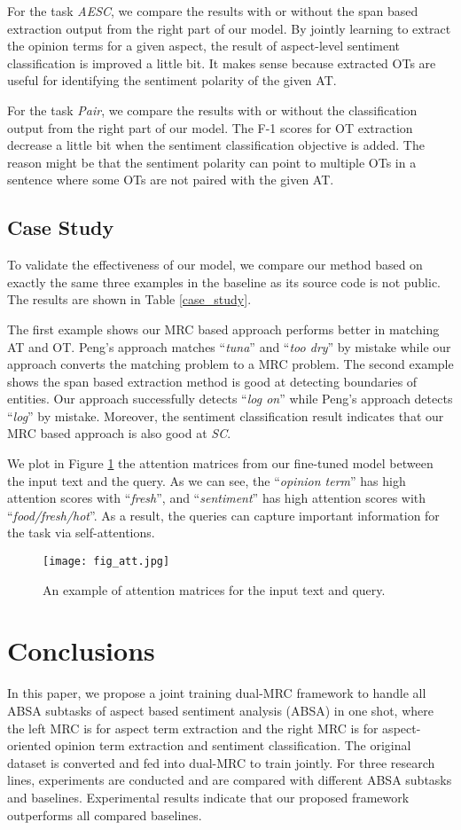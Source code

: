 \documentclass[letterpaper]{article} \usepackage{aaai21}  \usepackage{times}  \usepackage{helvet} \usepackage{courier}  \usepackage[hyphens]{url}  \usepackage{graphicx} \urlstyle{rm} \def\UrlFont{\rm}  \usepackage{natbib}  \usepackage{caption}
\begin{document}
For the task \emph{AESC}, we compare the results with or without the span based extraction output from the right part of our model.
By jointly learning to extract the opinion terms for a given aspect, the result of aspect-level sentiment classification is improved a little bit.  
It makes sense because extracted OTs are useful for identifying the sentiment polarity of the given AT. 

For the task \emph{Pair}, we compare the results with or without the classification output from the right part of our model. 
The F-1 scores for OT extraction decrease a little bit when the sentiment classification objective is added. 
The reason might be that the sentiment polarity can point to multiple OTs in a sentence where some OTs are not paired with the given AT.
 

\subsection{Case Study}
To validate the effectiveness of our model, we compare our method based on exactly the same three examples in the baseline \cite{peng2020knowing} as its source code is not public. 
The results are shown in Table \ref{case_study}.

The first example shows our MRC based approach performs better in matching AT and OT. 
Peng's approach matches ``\emph{tuna}'' and ``\emph{too dry}'' by mistake while our approach converts the matching problem to a MRC problem. 
The second example shows the span based extraction method is good at detecting boundaries of entities. 
Our approach successfully detects ``\emph{log on}'' while Peng's approach detects ``\emph{log}'' by mistake.
Moreover, the sentiment classification result indicates that our MRC based approach is also good at \emph{SC}.

We plot in Figure \ref{fig_att} the attention matrices from our fine-tuned model between the input text and the query.
As we can see, the ``\emph{opinion term}'' has high attention scores with ``\emph{fresh}'', 
and ``\emph{sentiment}'' has high attention scores with ``\emph{food/fresh/hot}''. 
As a result, the queries can capture important information for the task via self-attentions. 
\begin{figure}[h!]
    \centering
    \texttt{[image: fig\_att.jpg]}
    \caption{An example of attention matrices for the input text and query.} \label{fig_att}
\end{figure}

\section{Conclusions}
In this paper, we propose a joint training dual-MRC framework to handle all ABSA subtasks of aspect based sentiment analysis (ABSA)
in one shot, where the left MRC is for aspect term extraction and the right MRC is for aspect-oriented opinion term extraction and sentiment classification.
The original dataset is converted and fed into dual-MRC to train jointly. For three research lines, 
experiments are conducted and are compared with different ABSA subtasks and baselines. 
Experimental results indicate that our proposed framework outperforms all compared baselines.


\end{document}

